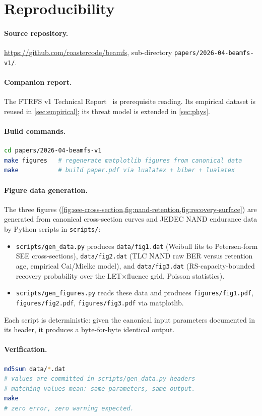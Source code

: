 \section{Reproducibility}\label{sec:repro}

\paragraph{Source repository.}
\url{https://github.com/roastercode/beamfs}, sub-directory
\texttt{papers/2026-04-beamfs-v1/}.

\paragraph{Companion report.}
The FTRFS v1 Technical Report~\cite{desbrieres2026ftrfs} is
prerequisite reading. Its empirical dataset is reused in
\cref{sec:empirical}; its threat model is extended in
\cref{sec:phys}.

\paragraph{Build commands.}
\begin{lstlisting}[language=bash]
cd papers/2026-04-beamfs-v1
make figures   # regenerate matplotlib figures from canonical data
make           # build paper.pdf via lualatex + biber + lualatex
\end{lstlisting}

\paragraph{Figure data generation.}
The three figures (\cref{fig:see-cross-section,fig:nand-retention,fig:recovery-surface}) are generated from canonical
cross-section curves and JEDEC NAND endurance data by Python scripts
in \texttt{scripts/}:
\begin{itemize}
\item \texttt{scripts/gen\_data.py} produces \texttt{data/fig1.dat}
  (Weibull fits to Petersen-form SEE cross-sections),
  \texttt{data/fig2.dat} (TLC NAND raw BER versus retention age,
  empirical Cai/Mielke model), and \texttt{data/fig3.dat}
  (RS-capacity-bounded recovery probability over the
  LET\(\times\)fluence grid, Poisson statistics).
\item \texttt{scripts/gen\_figures.py} reads these data and produces
  \texttt{figures/fig1.pdf}, \texttt{figures/fig2.pdf},
  \texttt{figures/fig3.pdf} via matplotlib.
\end{itemize}
Each script is deterministic: given the canonical input parameters
documented in its header, it produces a byte-for-byte identical
output.

\paragraph{Verification.}
\begin{lstlisting}[language=bash]
md5sum data/*.dat
# values are committed in scripts/gen_data.py headers
# matching values mean: same parameters, same output.
make
# zero error, zero warning expected.
\end{lstlisting}
